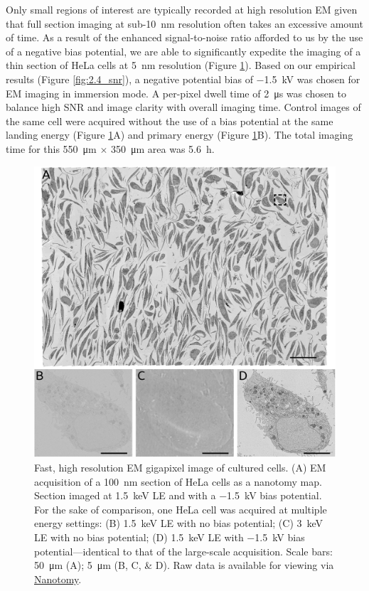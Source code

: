 Only small regions of interest are typically recorded at high resolution EM given that full section imaging at sub-\SI{10}{\nano\meter} resolution often takes an excessive amount of time. As a result of the enhanced signal-to-noise ratio afforded to us by the use of a negative bias potential, we are able to significantly expedite the imaging of a thin section of HeLa cells at \SI{5}{\nano\meter} resolution (Figure \ref{fig:2.6_cells}). Based on our empirical results (Figure \ref{fig:2.4_snr}), a negative potential bias of \SI{-1.5}{\kilo\volt} was chosen for EM imaging in immersion mode. A per-pixel dwell time of \SI{2}{\micro\second} was chosen to balance high SNR and image clarity with overall imaging time. Control images of the same cell were acquired without the use of a bias potential at the same landing energy (Figure \ref{fig:2.6_cells}A) and primary energy (Figure \ref{fig:2.6_cells}B). The total imaging time for this \SI{550}{\micro\meter} $\times$ \SI{350}{\micro\meter} area was \SI{5.6}{\hour}.

\begin{figure}[!tb]
    \centering
    \includegraphics[width=\linewidth]{chapter-2/figures_JPEG_HQ/fig2-6_cells.jpg}
    \caption{Fast, high resolution EM gigapixel image of cultured cells. (A) EM acquisition of a \SI{100}{\nano\meter} section of HeLa cells as a nanotomy map. Section imaged at \SI{1.5}{\kilo\electronvolt} LE and with a \SI{-1.5}{\kilo\volt} bias potential. For the sake of comparison, one HeLa cell was acquired at multiple energy settings: (B) \SI{1.5}{\kilo\electronvolt} LE with no bias potential; (C) \SI{3}{\kilo\electronvolt} LE with no bias potential; (D) \SI{1.5}{\kilo\electronvolt} LE with \SI{-1.5}{\kilo\volt} bias potential—identical to that of the large-scale acquisition. Scale bars: \SI{50}{\micro\meter} (A); \SI{5}{\micro\meter} (B, C, \& D). Raw data is available for viewing via \href{www.nanotomy.org}{Nanotomy}.}
    \label{fig:2.6_cells}
\end{figure}

